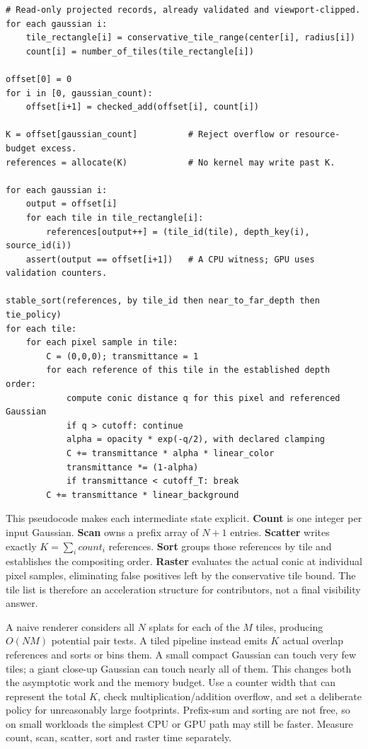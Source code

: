 \begin{verbatim}
# Read-only projected records, already validated and viewport-clipped.
for each gaussian i:
    tile_rectangle[i] = conservative_tile_range(center[i], radius[i])
    count[i] = number_of_tiles(tile_rectangle[i])

offset[0] = 0
for i in [0, gaussian_count):
    offset[i+1] = checked_add(offset[i], count[i])

K = offset[gaussian_count]          # Reject overflow or resource-budget excess.
references = allocate(K)            # No kernel may write past K.

for each gaussian i:
    output = offset[i]
    for each tile in tile_rectangle[i]:
        references[output++] = (tile_id(tile), depth_key(i), source_id(i))
    assert(output == offset[i+1])   # A CPU witness; GPU uses validation counters.

stable_sort(references, by tile_id then near_to_far_depth then tie_policy)
for each tile:
    for each pixel sample in tile:
        C = (0,0,0); transmittance = 1
        for each reference of this tile in the established depth order:
            compute conic distance q for this pixel and referenced Gaussian
            if q > cutoff: continue
            alpha = opacity * exp(-q/2), with declared clamping
            C += transmittance * alpha * linear_color
            transmittance *= (1-alpha)
            if transmittance < cutoff_T: break
        C += transmittance * linear_background
\end{verbatim}

This pseudocode makes each intermediate state explicit. \textbf{Count} is one integer per input Gaussian. \textbf{Scan} owns a prefix array of \(N+1\) entries. \textbf{Scatter} writes exactly \(K=\sum_i count_i\) references. \textbf{Sort} groups those references by tile and establishes the compositing order. \textbf{Raster} evaluates the actual conic at individual pixel samples, eliminating false positives left by the conservative tile bound. The tile list is therefore an acceleration structure for contributors, not a final visibility answer.

A naive renderer considers all \(N\) splats for each of the \(M\) tiles, producing \(O(NM)\) potential pair tests. A tiled pipeline instead emits \(K\) actual overlap references and sorts or bins them. A small compact Gaussian can touch very few tiles; a giant close-up Gaussian can touch nearly all of them. This changes both the asymptotic work and the memory budget. Use a counter width that can represent the total \(K\), check multiplication/addition overflow, and set a deliberate policy for unreasonably large footprints. Prefix-sum and sorting are not free, so on small workloads the simplest CPU or GPU path may still be faster. Measure count, scan, scatter, sort and raster time separately.

